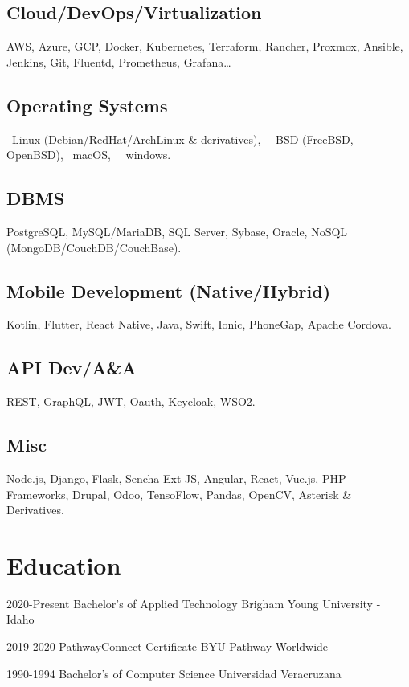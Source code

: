 \documentclass[]{friggeri-cv}
\begin{document}
\begin{multicols}{2}
    \subsection{Cloud/DevOps/Virtualization}
    AWS, Azure, GCP, Docker, Kubernetes, Terraform, Rancher, Proxmox, Ansible, Jenkins, Git, Fluentd, Prometheus, Grafana\dots
 
    \subsection{Operating Systems}
    {\faLinux}~Linux (Debian/RedHat/ArchLinux \& derivatives), {\nfBsd}~~BSD (FreeBSD, OpenBSD), {\faApple}~macOS, {\nfWindows}~~windows.

    \subsection{DBMS}
    PostgreSQL, MySQL/MariaDB, SQL Server, Sybase, Oracle, NoSQL (MongoDB/CouchDB/CouchBase).
    
    \subsection{Mobile Development (Native/Hybrid)}
    Kotlin, Flutter, React Native, Java, Swift, Ionic, PhoneGap, Apache Cordova.

    \subsection{API Dev/A\&A}
    REST, GraphQL, JWT, Oauth, Keycloak, WSO2.

    \subsection{Misc}
    Node.js, Django, Flask, Sencha Ext JS, Angular, React, Vue.js, PHP Frameworks, Drupal, Odoo, TensoFlow, Pandas, OpenCV, Asterisk \& Derivatives.

\end{multicols}

\section{Education}

\begin{entrylist}
    \entryedu%
    {2020-Present}
    {Bachelor's of Applied Technology}
    {Brigham Young University - Idaho}
\end{entrylist}

\begin{entrylist}
    \entryedu%
    {2019-2020}
    {PathwayConnect Certificate}
    {BYU-Pathway Worldwide}
\end{entrylist}

\begin{entrylist}
    \entryedu%
    {1990-1994}
    {Bachelor's of Computer Science}
    {Universidad Veracruzana}
\end{entrylist}
\end{document}
